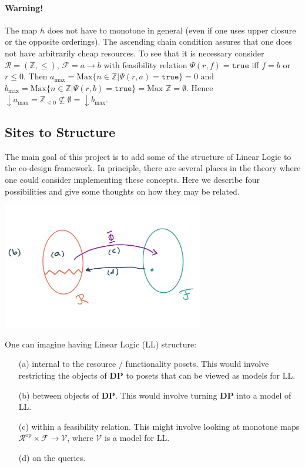 \documentclass[12pt]{article}
\theoremstyle{definition}
\theoremstyle{plain}
\theoremstyle{plain}
\theoremstyle{plain}
\theoremstyle{plain}
\theoremstyle{remark}
\theoremstyle{remark}
\newcommand{\mc}[1]{\mathcal{#1}}
\begin{document}
\paragraph{Warning!} The map $h$ does not have to monotone in general (even if one uses upper closure or the opposite orderings). The ascending chain condition assures that one does not have arbitrarily cheap resources. To see that it is necessary consider $\mc{R} = (\mathbb{Z},\leq)$, $\mc{F} = {a \rightarrow b}$ with feasibility relation $\Psi(r,f) = \texttt{true}$ iff $f = b$ or $r \leq 0$. Then $a_\text{max} = \text{Max}\{n \in \mathbb{Z} | \Psi(r,a) = \texttt{true}\} = 0$ and $b_\text{max} = \text{Max}\{n \in \mathbb{Z} | \Psi(r,b) = \texttt{true}\} = \text{Max }\mathbb{Z} = \emptyset$. Hence $\downarrow a_\text{max} = \mathbb{Z}_{\leq 0} \nsubseteq \emptyset = \downarrow b_\text{max}$.

\subsection{Sites to Structure}

The main goal of this project is to add some of the structure of Linear Logic to the co-design framework. In principle, there are several places in the theory where one could consider implementing these concepts. Here we describe four possibilities and give some thoughts on how they may be related.
\begin{center}
	\includegraphics[width=250pt]{section2/sites_structure-1}
\end{center}

One can imagine having Linear Logic (LL) structure:
\begin{itemize}
	\item[(a)] internal to the resource / functionality posets. This would involve restricting the objects of $\mathbf{DP}$ to posets that can be viewed as models for LL.
	\item[(b)] between objects of $\mathbf{DP}$. This would involve turning $\mathbf{DP}$ into a model of LL.
	\item[(c)] within a feasibility relation. This might involve looking at monotone maps $\mc{R}^\text{op} \times \mc{F} \rightarrow \mc{V}$, where $\mc{V}$ is a model for LL.
	\item[(d)] on the queries. 
\end{itemize}
\end{document}
